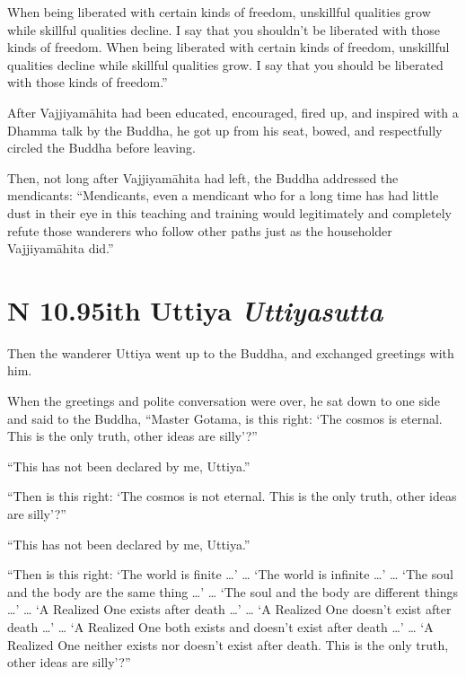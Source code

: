 \documentclass[12pt,openany]{book}%
\newcommand*{\suttatitleacronym}[1]{\smaller[2]{#1}\vspace*{.3em}}
\newcommand*{\suttatitletranslation}[1]{\linebreak{#1}}
\newcommand*{\suttatitleroot}[1]{\linebreak\smaller[2]\itshape{#1}}
\newcommand*{\tocacronym}[1]{\hspace*{-3.3em}{#1}\quad}
\newcommand*{\toctranslation}[1]{#1}
\newcommand*{\tocroot}[1]{(\textit{#1})}
\begin{document}
When being liberated with certain kinds of freedom, unskillful qualities grow while skillful qualities decline. I say that you shouldn’t be liberated with those kinds of freedom. When being liberated with certain kinds of freedom, unskillful qualities decline while skillful qualities grow. I say that you should be liberated with those kinds of freedom.” 

After \textsanskrit{Vajjiyamāhita} had been educated, encouraged, fired up, and inspired with a Dhamma talk by the Buddha, he got up from his seat, bowed, and respectfully circled the Buddha before leaving. 

Then, not long after \textsanskrit{Vajjiyamāhita} had left, the Buddha addressed the mendicants: “Mendicants, even a mendicant who for a long time has had little dust in their eye in this teaching and training would legitimately and completely refute those wanderers who follow other paths just as the householder \textsanskrit{Vajjiyamāhita} did.” 

%
\section*{{\suttatitleacronym AN 10.95}{\suttatitletranslation With Uttiya }{\suttatitleroot Uttiyasutta}}
\addcontentsline{toc}{section}{\tocacronym{AN 10.95} \toctranslation{With Uttiya } \tocroot{Uttiyasutta}}

Then the wanderer Uttiya went up to the Buddha, and exchanged greetings with him. 

When the greetings and polite conversation were over, he sat down to one side and said to the Buddha, “Master Gotama, is this right: ‘The cosmos is eternal. This is the only truth, other ideas are silly’?” 

“This has not been declared by me, Uttiya.” 

“Then is this right: ‘The cosmos is not eternal. This is the only truth, other ideas are silly’?” 

“This has not been declared by me, Uttiya.” 

“Then is this right: ‘The world is finite …’ … ‘The world is infinite …’ … ‘The soul and the body are the same thing …’ … ‘The soul and the body are different things …’ … ‘A Realized One exists after death …’ … ‘A Realized One doesn’t exist after death …’ … ‘A Realized One both exists and doesn’t exist after death …’ … ‘A Realized One neither exists nor doesn’t exist after death. This is the only truth, other ideas are silly’?” 
\end{document}
